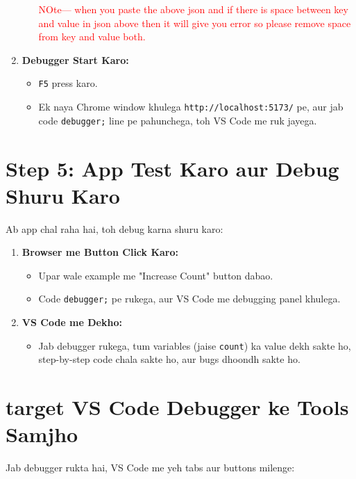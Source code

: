 \documentclass[a4paper,12pt]{article}
\begin{document}
\begin{enumerate}
\begin{itemize}
    \textcolor{red}{%
    NOte--- when you paste the above json and if there is space between key and 
        value in json above then it will give you 
        error so please remove space from key and 
        value both.
    }
        
    \end{itemize}

    \item \textbf{\color{myblue}Debugger Start Karo:}  
    \begin{itemize}
        \item \texttt{\color{mygreen}F5} press karo.
        \item Ek naya Chrome window khulega \texttt{\color{mygreen}http://localhost:5173/} pe, aur jab code \texttt{\color{mygreen}debugger;} line pe pahunchega, toh VS Code me ruk jayega.
    \end{itemize}
\end{enumerate}

\section{  Step 5: App Test Karo aur Debug Shuru Karo}
Ab app chal raha hai, toh debug karna shuru karo:  
\begin{enumerate}
    \item \textbf{\color{myblue}Browser me Button Click Karo:}  
    \begin{itemize}
        \item Upar wale example me "Increase Count" button dabao.
        \item Code \texttt{\color{mygreen}debugger;} pe rukega, aur VS Code me debugging panel khulega.
    \end{itemize}

    \item \textbf{\color{myblue}VS Code me Dekho:}  
    \begin{itemize}
        \item Jab debugger rukega, tum variables (jaise \texttt{\color{mygreen}count}) ka value dekh sakte ho, step-by-step code chala sakte ho, aur bugs dhoondh sakte ho.
    \end{itemize}
\end{enumerate}

\section{ {target} VS Code Debugger ke Tools Samjho}
Jab debugger rukta hai, VS Code me yeh tabs aur buttons milenge:
\end{document}
